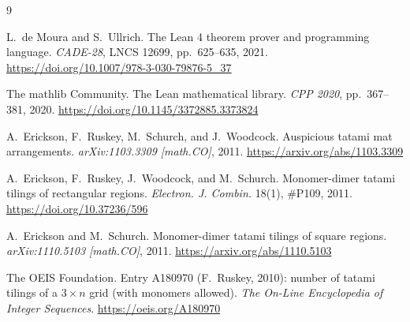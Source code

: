 \documentclass[11pt]{article}
\begin{document}
\begin{thebibliography}{9}

L.~de Moura and S.~Ullrich.
\newblock The Lean 4 theorem prover and programming language.
\newblock \emph{CADE-28}, LNCS 12699, pp.~625--635, 2021.
\url{https://doi.org/10.1007/978-3-030-79876-5_37}

The mathlib Community.
\newblock The Lean mathematical library.
\newblock \emph{CPP 2020}, pp.~367--381, 2020.
\url{https://doi.org/10.1145/3372885.3373824}

A.~Erickson, F.~Ruskey, M.~Schurch, and J.~Woodcock.
\newblock Auspicious tatami mat arrangements.
\newblock \emph{arXiv:1103.3309 [math.CO]}, 2011.
\url{https://arxiv.org/abs/1103.3309}

A.~Erickson, F.~Ruskey, J.~Woodcock, and M.~Schurch.
\newblock Monomer-dimer tatami tilings of rectangular regions.
\newblock \emph{Electron. J. Combin.} 18(1), \#P109, 2011.
\url{https://doi.org/10.37236/596}

A.~Erickson and M.~Schurch.
\newblock Monomer-dimer tatami tilings of square regions.
\newblock \emph{arXiv:1110.5103 [math.CO]}, 2011.
\url{https://arxiv.org/abs/1110.5103}

The OEIS Foundation.
\newblock Entry A180970 (F.~Ruskey, 2010): number of tatami tilings of a
$3 \times n$ grid (with monomers allowed).
\newblock \emph{The On-Line Encyclopedia of Integer Sequences}.
\url{https://oeis.org/A180970}

\end{thebibliography}
\end{document}
